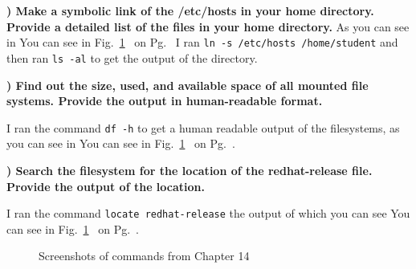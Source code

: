 \documentclass{report}
\newcommand{\mysubsection}[2]{\textbf{\romannumeral #1) #2}}
\begin{document}
\mysubsection{1}{Make a symbolic link of the /etc/hosts in your home directory. Provide a detailed list of the files in your home directory.}
As you can see in You can see in Fig.~\ref{Ch14}~ 
on Pg.~\pageref{Ch14} I ran {\scriptsize{\verb$ln -s /etc/hosts /home/student$}\normalsize} 
and then ran {\scriptsize{\verb$ls -al$}\normalsize} to get the output of the
directory.

\noindent\mysubsection{2}{Find out the size, used, and available space of all mounted file systems. Provide the output in human-readable format.}


I ran the command {\scriptsize{\verb$df -h$}\normalsize} to get a human
readable output of the filesystems, as you can see in You can see in
Fig.~\ref{Ch14}~ 
on Pg.~\pageref{Ch14}.


\noindent\mysubsection{3}{Search the filesystem for the location of the redhat-release file. Provide the output of the location.}


I ran the command {\scriptsize{\verb$locate redhat-release$}\normalsize} the
output of which you can see You can see in Fig.~\ref{Ch14}~ 
on Pg.~\pageref{Ch14}.



\begin{figure}[!hbt]\centering
{}\par
{}\par 
{}
\caption{Screenshots of commands from Chapter 14}
\label{Ch14}
\end{figure}




\end{document}
